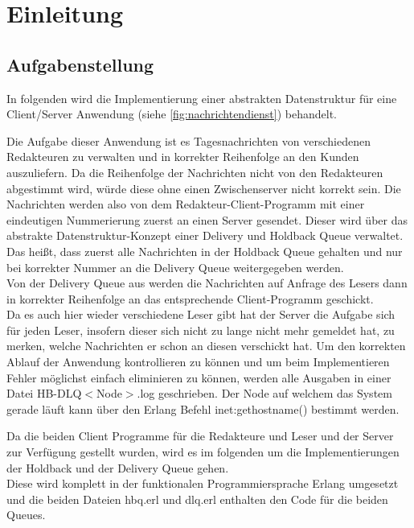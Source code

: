 \section{Einleitung}

\subsection{Aufgabenstellung}

In folgenden wird die Implementierung einer abstrakten Datenstruktur für eine Client/Server Anwendung (siehe \ref{fig:nachrichtendienst}) behandelt. 

Die Aufgabe dieser Anwendung ist es Tagesnachrichten von verschiedenen Redakteuren zu verwalten und in korrekter Reihenfolge an den Kunden auszuliefern. Da die Reihenfolge der Nachrichten nicht von den Redakteuren abgestimmt wird, würde diese ohne einen Zwischenserver nicht korrekt sein. Die Nachrichten werden also von dem Redakteur-Client-Programm mit einer eindeutigen Nummerierung zuerst an einen Server gesendet. Dieser wird über das abstrakte Datenstruktur-Konzept einer Delivery und Holdback Queue verwaltet. Das heißt, dass zuerst alle Nachrichten in der Holdback Queue gehalten und nur bei korrekter Nummer an die Delivery Queue weitergegeben werden.\\ 
Von der Delivery Queue aus werden die Nachrichten auf Anfrage des Lesers dann in korrekter Reihenfolge an das entsprechende Client-Programm geschickt.\\
Da es auch hier wieder verschiedene Leser gibt hat der Server die Aufgabe sich für jeden Leser, insofern dieser sich nicht zu lange nicht mehr gemeldet hat, zu merken, welche Nachrichten er schon an diesen verschickt hat. 
Um den korrekten Ablauf der Anwendung kontrollieren zu können und um beim Implementieren Fehler möglichst einfach eliminieren zu können, werden alle Ausgaben in einer Datei HB-DLQ$<$Node$>$.log geschrieben. Der Node auf welchem das System gerade läuft kann über den Erlang Befehl inet:gethostname() bestimmt werden.

Da die beiden Client Programme für die Redakteure und Leser und der Server zur Verfügung gestellt wurden, wird es im folgenden um die Implementierungen der Holdback und der Delivery Queue gehen.\\ 
Diese wird komplett in der funktionalen Programmiersprache Erlang umgesetzt und die beiden Dateien hbq.erl und dlq.erl enthalten den Code für die beiden Queues.  

